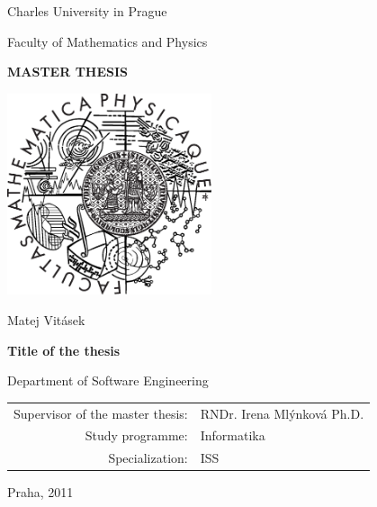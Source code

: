 \documentclass[a4paper,12pt,oneside]{report}
\def\mfauthor{Matej Vitásek}
\def\mfadvisor{RNDr. Irena Mlýnková Ph.D.}
\def\mfplacedate{Praha, 2011}
\begin{document}

\pagestyle{empty}
\begin{center}

\large

Charles University in Prague

\medskip

Faculty of Mathematics and Physics

\vfill

{\bf\Large MASTER THESIS}

\vfill

\centerline{\mbox{\includegraphics[width=60mm]{logo.eps}}}

\vfill
\vspace{5mm}

{\LARGE \mfauthor}

\vspace{15mm}

{\LARGE\bfseries Title of the thesis}

\vfill

Department of Software Engineering

\vfill

\begin{tabular}{rl}

Supervisor of the master thesis: & 	\mfadvisor \\
\noalign{\vspace{2mm}}
Study programme: & Informatika \\
\noalign{\vspace{2mm}}
Specialization: & ISS \\
\end{tabular}

\vfill

\mfplacedate 

\end{center}
\end{document}
